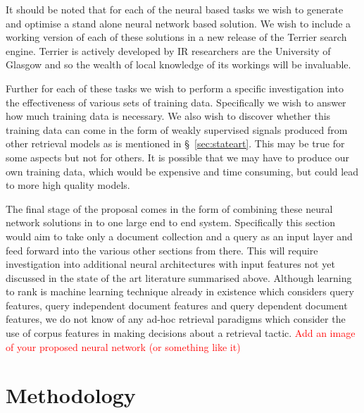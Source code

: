 \documentclass[11pt,english,twocolumn]{article}
\newcommand{\remove}[1]{\textcolor{red}{#1}}
\begin{document}
It should be noted that for each of the neural based tasks we wish to generate and optimise a stand alone neural network based solution. We wish to include a working version of each of these solutions in a new release of the Terrier search engine. Terrier is actively developed by IR researchers are the University of Glasgow and so the wealth of local knowledge of its workings will be invaluable.

Further for each of these tasks we wish to perform a specific investigation into the effectiveness of various sets of training data. Specifically we wish to answer how much training data is necessary.
We also wish to discover whether this training data can come in the form of weakly supervised signals produced from other retrieval models as is mentioned in \S~\ref{sec:stateart}. This may be true for some aspects but not for others.
It is possible that we may have to produce our own training data, which would be expensive and time consuming, but could lead to more high quality models.

The final stage of the proposal comes in the form of combining these neural network solutions in to one large end to end system. Specifically this section would aim to take only a document collection and a query as an input layer and feed forward into the various other sections from there. This will require investigation into additional neural architectures with input features not yet discussed in the state of the art literature summarised above. Although learning to rank is machine learning technique already in existence which considers query features, query independent document features and query dependent document features, we do not know of any ad-hoc retrieval paradigms which consider the use of corpus features in making decisions about a retrieval tactic. \remove{Add an image of your proposed neural network (or something like it)}

\section{Methodology}
\end{document}
